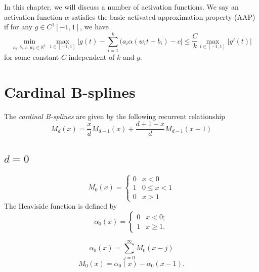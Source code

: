 In this chapter, we will discuss a number of activation functions.  We
say an activation function $\alpha$ 
satisfies the basic activated-approximation-property (AAP) if for any $g\in C^1[-1,1]$, we have
\begin{equation}
\label{AAP}
\min_{a_i,b_i,c,w_i\in\mathbb R^1}\max_{t\in[-1,1]}\bigg|g(t)-\sum_{i=1}^k(a_i\alpha(w_it+b_i)-c\bigg|
\le \frac{C}{k}\max_{t\in[-1,1]}|g'(t)|
\end{equation}
for some constant $C$ independent of $k$ and $g$. 

\section{Cardinal B-splines}
The {\it cardinal B-splines} are given by the following recurrent
relationship
\begin{equation}
  \label{cardinal}
M_d(x)=\frac{x}{d}M_{d-1}(x)  + \frac{d+1-x}{d}M_{d-1}(x-1)  
\end{equation}
\subsection{$d=0$}
\begin{equation}
  \label{cardinal}
M_0(x)=
\left\{
  \begin{array}{ll}
0 & x<0 \\
1 & 0\le x<1    \\
0 & x > 1    
  \end{array}
\right.
\end{equation}
The Heaviside function is defined by
\begin{equation}
  \label{a0}
\alpha_0(x)=
\left\{
  \begin{array}{ll}
0 & x<0; \\
1 & x \ge 1.
  \end{array}
\right.
\end{equation}
\begin{lemma}
  \begin{equation}
  \label{a0M0}
\alpha_0(x)=\sum_{j=0}^\infty M_0(x-j)    
  \end{equation}
  \begin{equation}
  \label{M0a0}
M_0(x)=\alpha_0(x)-\alpha_0(x-1).
  \end{equation}
\end{lemma}

